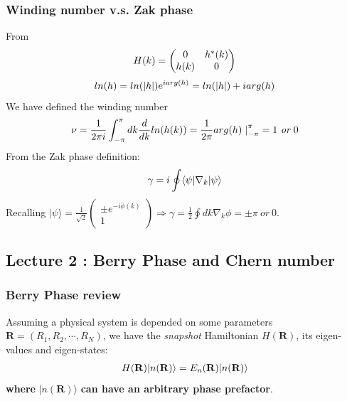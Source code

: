 \documentclass[letterpaper,10pt,english]{sphinxmanual}
\begin{document}
\subsubsection{Winding number v.s. Zak phase}
\label{TI/Lecture notes/1:winding-number-v-s-zak-phase}
From
\begin{gather}
\begin{split}H(k)=\begin{pmatrix}0&h^*(k)\\h(k)&0\end{pmatrix}\end{split}\notag
\end{gather}\begin{gather}
\begin{split}ln(h)=ln(|h|)e^{iarg(h)}=ln(|h|)+iarg(h)\end{split}\notag
\end{gather}
We have defined the winding number
\begin{gather}
\begin{split}\nu=\frac{1}{2\pi i}\int_{-\pi}^{\pi}dk\frac{d}{dk}ln(h(k))=\frac{1}{2\pi}arg(h)\left.\right|_{-\pi}^{\pi}=1 \ \textit{or}\  0\end{split}\notag
\end{gather}
From the Zak phase definition:
\begin{gather}
\begin{split}\gamma=i\oint\langle\psi|\nabla_k|\psi\rangle\end{split}\notag
\end{gather}
Recalling
\(|\psi\rangle=\frac{1}{\sqrt{2}}\begin{pmatrix}\pm e^{-i\phi(k)}\\ 1\end{pmatrix}\Rightarrow\gamma=\frac{1}{{2}}\oint dk\nabla_k\phi=\pm\pi \ \textit{or}\  0\).


\subsection{Lecture 2 : Berry Phase and Chern number}
\label{TI/Lecture notes/2:lecture-2-berry-phase-and-chern-number}\label{TI/Lecture notes/2::doc}

\subsubsection{Berry Phase review}
\label{TI/Lecture notes/2:berry-phase-review}
Assuming a physical system is depended on some parameters \(\mathbf{R}=(R_1,R_2,\cdots,R_N)\), we have the \emph{snapshot} Hamiltonian \(H(\mathbf{R})\), its eigen-values and eigen-states:
\begin{gather}
\begin{split}H(\mathbf{R})|n(\mathbf{R})\rangle=E_n(\mathbf{R})|n(\mathbf{R})\rangle\end{split}\notag
\end{gather}
\textbf{where} \(|n(\mathbf{R})\rangle\) \textbf{can have an arbitrary phase
prefactor}.
\end{document}
